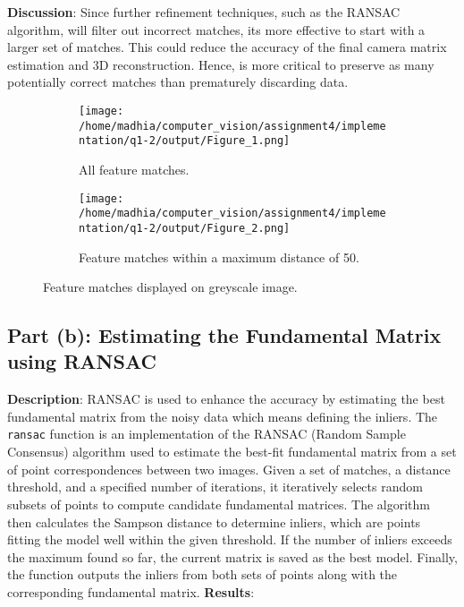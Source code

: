 \documentclass{article}
\begin{document}
\textbf{Discussion}: %
Since further refinement techniques, such as the RANSAC algorithm, will filter out incorrect matches, its more effective to start with a larger set of matches.
This could reduce the accuracy of the final camera matrix estimation and 3D reconstruction. Hence, is more critical to preserve as many potentially correct matches than 
prematurely discarding data. 

\begin{figure}[h!]
    \centering
    \begin{subfigure}[b]{0.45\textwidth}
        \centering
        \texttt{[image: /home/madhia/computer\_vision/assignment4/implementation/q1-2/output/Figure\_1.png]}
        \caption{All feature matches.}
        \label{fig:first}
    \end{subfigure}
    \hfill
    \begin{subfigure}[b]{0.45\textwidth}
        \centering
        \texttt{[image: /home/madhia/computer\_vision/assignment4/implementation/q1-2/output/Figure\_2.png]}
        \caption{Feature matches within a maximum distance of 50.}
        \label{fig:second}
    \end{subfigure}
    
    \caption{Feature matches displayed on greyscale image.}
    \label{fig:overall}
\end{figure}

\subsection{Part (b): Estimating the Fundamental Matrix using RANSAC}
\textbf{Description}: %
RANSAC is used to enhance the accuracy by estimating the best fundamental matrix from the noisy data which means defining the inliers. 
The \texttt{ransac} function is an implementation of the RANSAC (Random Sample Consensus) algorithm used to estimate the best-fit fundamental matrix from a set of point correspondences between two images.
Given a set of matches, a distance threshold, and a specified number of iterations, it iteratively selects random subsets of points to compute candidate fundamental matrices. 
The algorithm then calculates the Sampson distance to determine inliers, which are points fitting the model well within the given threshold. 
If the number of inliers exceeds the maximum found so far, the current matrix is saved as the best model. 
Finally, the function outputs the inliers from both sets of points along with the corresponding fundamental matrix.
\textbf{Results}: %
\end{document}
